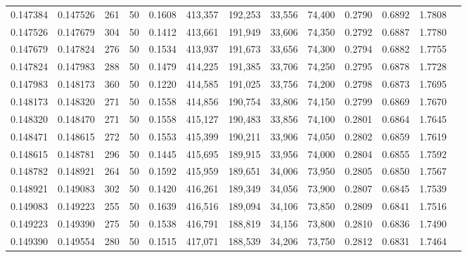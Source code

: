 \begin{tabular}{rrrrrrrrrrrrr}
0.147384 & 0.147526 &   261 &  50 &                                     0.1608 & 413,357 & 192,253 &  33,556 &  74,400 & 0.2790 & 0.6892 & 1.7808 \\
0.147526 & 0.147679 &   304 &  50 &                                     0.1412 & 413,661 & 191,949 &  33,606 &  74,350 & 0.2792 & 0.6887 & 1.7780 \\
0.147679 & 0.147824 &   276 &  50 &                                     0.1534 & 413,937 & 191,673 &  33,656 &  74,300 & 0.2794 & 0.6882 & 1.7755 \\
0.147824 & 0.147983 &   288 &  50 &                                     0.1479 & 414,225 & 191,385 &  33,706 &  74,250 & 0.2795 & 0.6878 & 1.7728 \\
0.147983 & 0.148173 &   360 &  50 &                                     0.1220 & 414,585 & 191,025 &  33,756 &  74,200 & 0.2798 & 0.6873 & 1.7695 \\
0.148173 & 0.148320 &   271 &  50 &                                     0.1558 & 414,856 & 190,754 &  33,806 &  74,150 & 0.2799 & 0.6869 & 1.7670 \\
0.148320 & 0.148470 &   271 &  50 &                                     0.1558 & 415,127 & 190,483 &  33,856 &  74,100 & 0.2801 & 0.6864 & 1.7645 \\
0.148471 & 0.148615 &   272 &  50 &                                     0.1553 & 415,399 & 190,211 &  33,906 &  74,050 & 0.2802 & 0.6859 & 1.7619 \\
0.148615 & 0.148781 &   296 &  50 &                                     0.1445 & 415,695 & 189,915 &  33,956 &  74,000 & 0.2804 & 0.6855 & 1.7592 \\
0.148782 & 0.148921 &   264 &  50 &                                     0.1592 & 415,959 & 189,651 &  34,006 &  73,950 & 0.2805 & 0.6850 & 1.7567 \\
0.148921 & 0.149083 &   302 &  50 &                                     0.1420 & 416,261 & 189,349 &  34,056 &  73,900 & 0.2807 & 0.6845 & 1.7539 \\
0.149083 & 0.149223 &   255 &  50 &                                     0.1639 & 416,516 & 189,094 &  34,106 &  73,850 & 0.2809 & 0.6841 & 1.7516 \\
0.149223 & 0.149390 &   275 &  50 &                                     0.1538 & 416,791 & 188,819 &  34,156 &  73,800 & 0.2810 & 0.6836 & 1.7490 \\
0.149390 & 0.149554 &   280 &  50 &                                     0.1515 & 417,071 & 188,539 &  34,206 &  73,750 & 0.2812 & 0.6831 & 1.7464 \\

\end{tabular}
